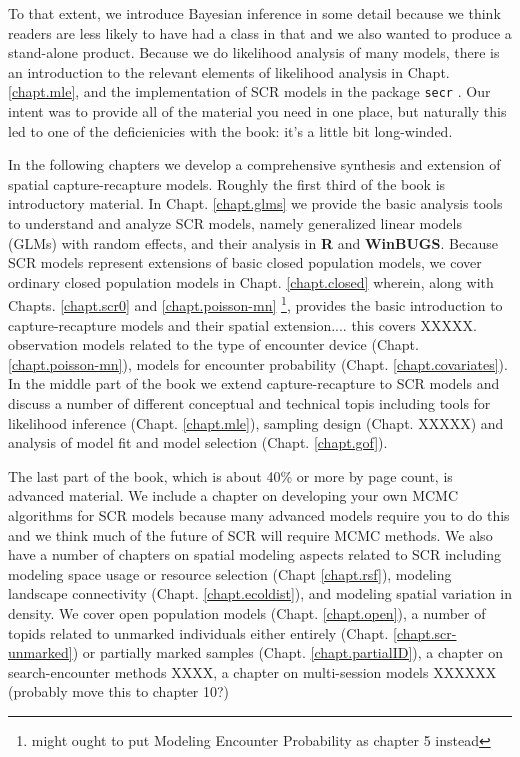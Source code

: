\begin{itemize}
To that extent, we introduce Bayesian inference in some detail because
we think readers are less
likely to have had a class in that and we also wanted to produce a
stand-alone product.  Because we do likelihood analysis of many models,
there is an introduction to the relevant elements of likelihood
analysis in Chapt. \ref{chapt.mle}, and the implementation of SCR
models in the package \mbox{\tt secr} \citep{efford_etal:2009euring}.
Our intent was to provide all of the material you
need in one place, but naturally this led to one of the deficienicies with the
book: it's a little bit long-winded.  


In the following chapters we develop a comprehensive synthesis and
extension of spatial capture-recapture models.  Roughly the first
third of the book is introductory material. In Chapt. \ref{chapt.glms}
we provide the basic analysis tools to understand and analyze SCR
models, namely generalized linear models (GLMs) with random effects,
and their analysis in {\bf R} and {\bf WinBUGS}.  Because SCR models
represent extensions of basic closed population models, we cover
ordinary closed population models in Chapt. \ref{chapt.closed}
wherein, along with Chapts. \ref{chapt.scr0} and
\ref{chapt.poisson-mn} \footnote{might ought to put Modeling Encounter
  Probability as chapter 5 instead}, provides the basic introduction
to capture-recapture models and their spatial extension.... this
covers XXXXX.  observation models related to the type of encounter
device (Chapt. \ref{chapt.poisson-mn}), models for encounter
probability (Chapt. \ref{chapt.covariates}). In the middle part of the
book we extend capture-recapture to SCR models and discuss a number of
different conceptual and technical topis including tools for
likelihood inference (Chapt. \ref{chapt.mle}), sampling design
(Chapt. XXXXX) and analysis of model fit and model selection
(Chapt. \ref{chapt.gof}).

The last part of the book, which is about 40\% or more by page
count, is advanced material.  We include a chapter on developing your
own MCMC algorithms for SCR models because many advanced
models require you to do this and we think much of the future of SCR
will require MCMC methods.  We also have a number of chapters on
spatial modeling aspects related to SCR including modeling space usage
or resource selection (Chapt \ref{chapt.rsf}), modeling landscape
connectivity (Chapt. \ref{chapt.ecoldist}), and modeling spatial
variation in density.  We cover open population models
(Chapt. \ref{chapt.open}), a number of topids related to unmarked individuals
either entirely (Chapt. \ref{chapt.scr-unmarked}) or partially marked
samples (Chapt. \ref{chapt.partialID}), a chapter on search-encounter
methods XXXX, a chapter on multi-session models XXXXXX (probably move
this to chapter 10?)


\end{itemize}
